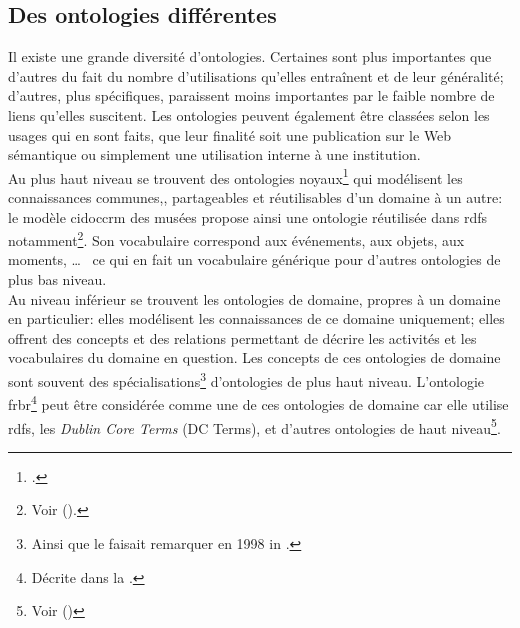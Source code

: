 \subsection{\label{II-B-1-b}Des ontologies différentes}

Il existe une grande diversité d'ontologies. Certaines sont plus importantes que d'autres du fait du nombre d'utilisations qu'elles entraînent et de leur généralité; d'autres, plus spécifiques, paraissent moins importantes par le faible nombre de liens qu'elles suscitent. Les ontologies peuvent également être classées selon les usages qui en sont faits, que leur finalité soit une publication sur le Web sémantique ou simplement une utilisation interne à une institution.\\

Au plus haut niveau se trouvent des ontologies \og noyaux\fg{}\footcite[p.4]{isaac_les_2012} qui modélisent les connaissances communes,, partageables et réutilisables d'un domaine à un autre: le modèle \ac{cidoccrm} des musées propose ainsi une ontologie réutilisée dans \ac{rdfs} notamment\footnote{Voir  ().}. Son vocabulaire correspond aux événements, aux objets, aux moments, \dots ~ ce qui en fait un vocabulaire générique pour d'autres ontologies de plus bas niveau.\\

Au niveau inférieur se trouvent les ontologies de domaine, propres à un domaine en particulier: elles modélisent les connaissances de ce domaine uniquement; elles offrent des concepts et des relations permettant de décrire les activités et les vocabulaires du domaine en question. Les concepts de ces ontologies de domaine sont souvent des spécialisations\footnote{Ainsi que le faisait remarquer  en 1998 in \cite{studer_knowledge_1998}.} d'ontologies de plus haut niveau. L'ontologie \ac{frbr}\footnote{Décrite dans la .} peut être considérée comme une de ces ontologies de domaine car elle utilise \ac{rdfs}, les \textit{Dublin Core Terms} (DC Terms), et d'autres ontologies de haut niveau\footnote{Voir  ()}.\\

